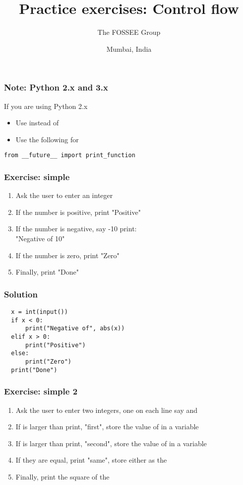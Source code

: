 \documentclass[14pt,compress]{beamer}
\title[Basic Python]{Practice exercises: Control flow}
\author[FOSSEE Team] {The FOSSEE Group}
\institute[FOSSEE -- IITB] {Department of Aerospace Engineering\\IIT Bombay}
\date[] {Mumbai, India}
\begin{document}
\begin{frame}
  \titlepage
\end{frame}

\begin{frame}
  \frametitle{Note: Python 2.x and 3.x}

 If you are using Python 2.x
  \begin{itemize}
  \item Use  instead of 
  \item Use the following for 
  \end{itemize}
 \begin{lstlisting}
from __future__ import print_function
\end{lstlisting}
\end{frame}

\begin{frame}[plain]
  \frametitle{Exercise: simple }
  \begin{enumerate}
  \item Ask the user to enter an integer
  \item If the number is positive, print "Positive"
  \item If the number is negative, say -10 print:\\ "Negative of 10"
  \item If the number is zero, print "Zero"
  \item Finally, print "Done"
  \end{enumerate}
\end{frame}

\begin{frame}
\frametitle{Solution}
\begin{lstlisting}
  x = int(input())
  if x < 0:
      print("Negative of", abs(x))
  elif x > 0:
      print("Positive")
  else:
      print("Zero")
  print("Done")
\end{lstlisting}
\end{frame}

\begin{frame}[plain]
  \frametitle{Exercise: simple  2}
  \begin{enumerate}
  \item Ask the user to enter two integers, one on each line say  and 
  \item If  is larger than  print, "first", store the value of  in a
    variable 
  \item If  is larger than  print, "second", store the value of  in a
    variable 
  \item If they are equal, print "same", store either as the 
  \item Finally, print the square of the 
  \end{enumerate}
\end{frame}
\end{document}
